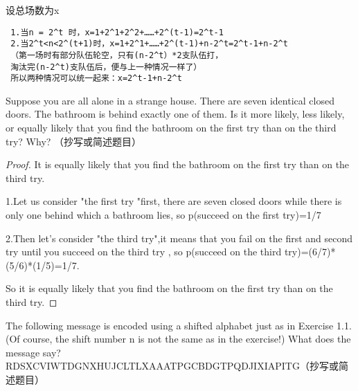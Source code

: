 \documentclass[11pt, a4paper, UTF8]{ctexart}
\begin{document}
\begin{solution}
设总场数为x
 \begin{verbatim}  
 1.当n = 2^t 时，x=1+2^1+2^2+……+2^(t-1)=2^t-1
 2.当2^t<n<2^(t+1)时，x=1+2^1+……+2^(t-1)+n-2^t=2^t-1+n-2^t
 （第一场时有部分队伍轮空，只有(n-2^t）*2支队伍打，
 淘汰完(n-2^t)支队伍后，便与上一种情况一样了）
 所以两种情况可以统一起来：x=2^t-1+n-2^t
  \end{verbatim} 
 \end{solution}

\begin{problem}[UD: 1.5]	%
  Suppose you are all alone in a strange house. There are seven identical closed doors. The bathroom is behind exactly one of them. Is it more likely, less likely, or equally likely that you find the bathroom on the first try than on the third try? Why? （抄写或简述题目）
\end{problem}

\begin{remark}	%
  
\end{remark}

\begin{proof}
It is equally likely that you find the bathroom on the first try than on the third try.
 
 1.Let us consider "the first try "first, there are seven closed doors while there is only one behind which a bathroom lies, so p(succeed on the first try)=1/7
 
 2.Then let's consider "the third try",it means that you fail on the first and second try until you succeed on the third try , so p(succeed on the third try)=(6/7)*(5/6)*(1/5)=1/7.
 
 So it is equally likely that you find the bathroom on the first try than on the third try.
 \end{proof}

\begin{problem}[UD: 1.6]	%
  The following message is encoded using a shifted alphabet just as in Exercise 1.1. (Of course, the shift number n is not the same as in the exercise!) What does the message say?
RDSXCVIWTDGNXHUJCLTLXAAATPGCBDGTPQDJIXIAPITG（抄写或简述题目）
\end{problem}
\end{document}
